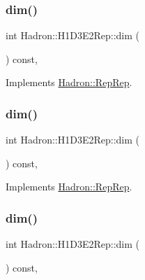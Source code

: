 \subsubsection{\texorpdfstring{dim()}{dim()}\hspace{0.1cm}{\footnotesize\ttfamily [3/5]}}
{\footnotesize\ttfamily int Hadron\+::\+H1\+D3\+E2\+Rep\+::dim (\begin{DoxyParamCaption}{ }\end{DoxyParamCaption}) const\hspace{0.3cm}{\ttfamily [inline]}, {\ttfamily [virtual]}}



Implements \mbox{\hyperlink{structHadron_1_1RepRep_a92c8802e5ed7afd7da43ccfd5b7cd92b}{Hadron\+::\+Rep\+Rep}}.

\mbox{\label{structHadron_1_1H1D3E2Rep_ac3d25d7b7ce1156c787d549f631689e8}} 
\subsubsection{\texorpdfstring{dim()}{dim()}\hspace{0.1cm}{\footnotesize\ttfamily [4/5]}}
{\footnotesize\ttfamily int Hadron\+::\+H1\+D3\+E2\+Rep\+::dim (\begin{DoxyParamCaption}{ }\end{DoxyParamCaption}) const\hspace{0.3cm}{\ttfamily [inline]}, {\ttfamily [virtual]}}



Implements \mbox{\hyperlink{structHadron_1_1RepRep_a92c8802e5ed7afd7da43ccfd5b7cd92b}{Hadron\+::\+Rep\+Rep}}.

\mbox{\label{structHadron_1_1H1D3E2Rep_ac3d25d7b7ce1156c787d549f631689e8}} 
\subsubsection{\texorpdfstring{dim()}{dim()}\hspace{0.1cm}{\footnotesize\ttfamily [5/5]}}
{\footnotesize\ttfamily int Hadron\+::\+H1\+D3\+E2\+Rep\+::dim (\begin{DoxyParamCaption}{ }\end{DoxyParamCaption}) const\hspace{0.3cm}{\ttfamily [inline]}, {\ttfamily [virtual]}}



